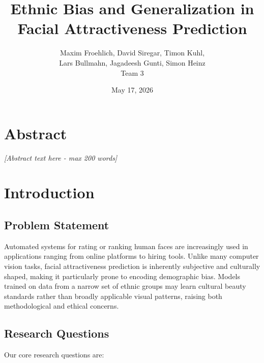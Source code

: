 \documentclass[a4paper,oneside,bibliography=totoc]{scrbook}
\begin{document}
\frontmatter
\subject{Project Report}
\title{Ethnic Bias and Generalization in Facial Attractiveness Prediction}
\author{Maxim Froehlich, David Siregar, Timon Kuhl,\\
  Lars Bullmahn, Jagadeesh Gunti, Simon Heinz\\
  Team 3}
\date{May 17, 2026}
\publishers{{\small Submitted to}\\
  Data and Web Science Group\\
  Prof.\ Dr.\ Christian Bizer\\
  University of Mannheim\\}
\maketitle

\chapter{Abstract}

\textit{[Abstract text here - max 200 words]}

\begingroup%
\hypersetup{hidelinks}
\tableofcontents%
\endgroup

\mainmatter

\chapter{Introduction}
\label{ch:intro}

\section{Problem Statement}


Automated systems for rating or ranking human faces are increasingly used in applications ranging from online platforms to hiring tools. Unlike many computer vision tasks, facial attractiveness prediction is inherently subjective and culturally shaped, making it particularly prone to encoding demographic bias. Models trained on data from a narrow set of ethnic groups may learn cultural beauty standards rather than broadly applicable visual patterns, raising both methodological and ethical concerns.

\section{Research Questions}

Our core research questions are:
\end{document}
